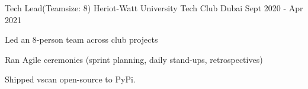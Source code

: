 

\begin{cventries}
\cventry
{Tech Lead(Teamsize: 8)} %
{Heriot-Watt University Tech Club} %
{Dubai} %
{Sept 2020 - Apr 2021} %
{
	\begin{cvitems} %
		\item {Led an 8-person team across club projects}
		\item {Ran Agile ceremonies (sprint planning, daily stand-ups, retrospectives)}
		\item {Shipped vscan open-source to PyPi.}
	\end{cvitems}
}

\end{cventries}
